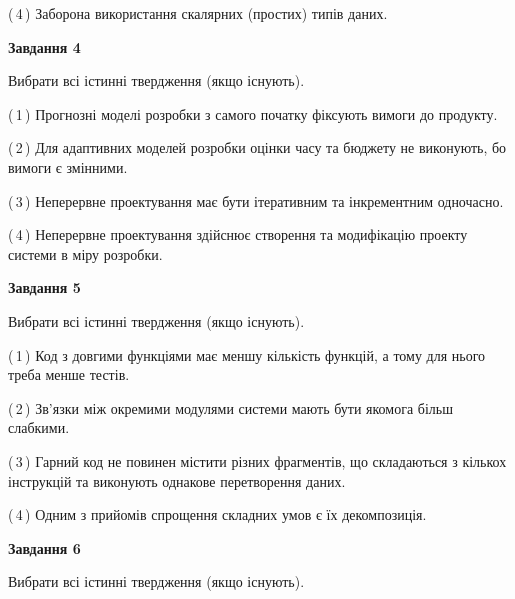 \documentclass[10pt, ukrainian]{article}
\begin{document}
{\begin {large}
(\,4\,) Заборона використання скалярних (простих) типів даних. %


{\begin {center}\textbf{Завдання 4}\end {center}}\par
Вибрати всі істинні твердження (якщо існують).\par
\vspace{2mm}



(\,1\,) Прогнозні моделі розробки з самого початку фіксують вимоги до продукту. %



(\,2\,) Для адаптивних моделей розробки оцінки часу та бюджету не виконують, бо вимоги є змінними. %



(\,3\,) Неперервне проектування має бути ітеративним та інкрементним одночасно. %



(\,4\,) Неперервне проектування здійснює створення та модифікацію проекту системи в міру розробки. %


{\begin {center}\textbf{Завдання 5}\end {center}}\par
Вибрати всі істинні твердження (якщо існують).\par
\vspace{2mm}



(\,1\,) Код з довгими функціями має меншу кількість функцій, а тому для нього треба менше тестів. %



(\,2\,) Зв'язки між окремими модулями системи мають бути якомога більш слабкими. %



(\,3\,) Гарний код не повинен містити різних фрагментів, що складаються з кількох інструкцій та виконують однакове перетворення даних. %



(\,4\,) Одним з прийомів спрощення складних умов є їх декомпозиція. %

\newpage

{\begin {center}\textbf{Завдання 6}\end {center}}\par
Вибрати всі істинні твердження (якщо існують).\par
\vspace{2mm}




\end{large}}
\end{document}
